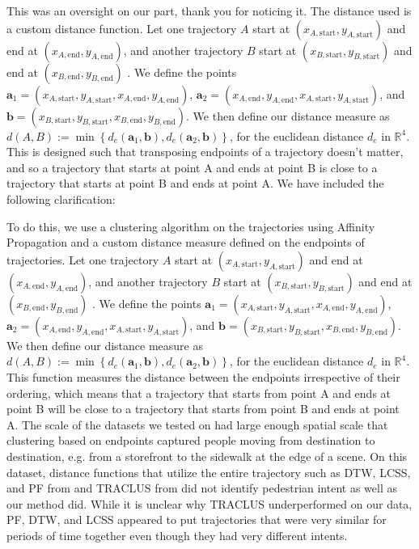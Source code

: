 \documentclass[usenames,dvipsnames]{article}
\providecommand{\response}[1]{
\noindent
\noindent\colorbox{gray!20}{
\parbox{\textwidth}{
\setlength{\parskip}{.1in}
\setlength{\parindent}{.1in}
#1}
}
}
\begin{document}
\begin{enumerate}
\begin{item}
This was an oversight on our part, thank you for noticing it. 
The distance used is a custom distance function. 
Let one trajectory $A$ start at $(x_{A,\mathrm{start}}, y_{A,\mathrm{start}})$ and end at  $(x_{A,\mathrm{end}}, y_{A,\mathrm{end}})$, and another trajectory $B$ start at $(x_{B,\mathrm{start}}, y_{B,\mathrm{start}})$ and end at $(x_{B,\mathrm{end}}, y_{B,\mathrm{end}})$ . 
We define the points $\mathbf{a}_1 = (x_{A, \mathrm{start}}, y_{A, \mathrm{start}}, x_{A, \mathrm{end}}, y_{A, \mathrm{end}})$, $\mathbf{a}_2 = (x_{A, \mathrm{end}}, y_{A, \mathrm{end}}, x_{A, \mathrm{start}}, y_{A, \mathrm{start}})$, and $\mathbf{b} = (x_{B, \mathrm{start}}, y_{B, \mathrm{start}}, x_{B, \mathrm{end}}, y_{B, \mathrm{end}})$. 
We then define our distance measure as $d(A, B) :=  \min \left\{ d_e(\mathbf{a}_1, \mathbf{b}), d_e(\mathbf{a}_2, \mathbf{b}) \right\}$, for the euclidean distance $d_e$ in $\mathbb{R}^4$.  This is designed such that transposing endpoints of a trajectory doesn't matter, and so a trajectory that starts at point A and ends at point B is close to a trajectory that starts at point B and ends at point A.  
We have included the following clarification:

\reversemarginpar{}
\response{To do this, we use a clustering algorithm on the trajectories using Affinity Propagation \cite{FreyDueck2007} and a custom distance measure defined on the endpoints of trajectories. 
	Let one trajectory $A$ start at $(x_{A,\mathrm{start}}, y_{A,\mathrm{start}})$ and end at  $(x_{A,\mathrm{end}}, y_{A,\mathrm{end}})$, and another trajectory $B$ start at $(x_{B,\mathrm{start}}, y_{B,\mathrm{start}})$ and end at $(x_{B,\mathrm{end}}, y_{B,\mathrm{end}})$ . 
	We define the points $\mathbf{a}_1 = (x_{A, \mathrm{start}}, y_{A, \mathrm{start}}, x_{A, \mathrm{end}}, y_{A, \mathrm{end}})$, $\mathbf{a}_2 = (x_{A, \mathrm{end}}, y_{A, \mathrm{end}}, x_{A, \mathrm{start}}, y_{A, \mathrm{start}})$, and $\mathbf{b} = (x_{B, \mathrm{start}}, y_{B, \mathrm{start}}, x_{B, \mathrm{end}}, y_{B, \mathrm{end}})$. 
	We then define our distance measure as $d(A, B) :=  \min \left\{ d_e(\mathbf{a}_1, \mathbf{b}), d_e(\mathbf{a}_2, \mathbf{b}) \right\}$, for the euclidean distance $d_e$ in $\mathbb{R}^4$. 
	This function measures the distance between the endpoints irrespective of their ordering, which means that a trajectory that starts from point A and ends at point B will be close to a trajectory that starts from point B and ends at point A.
	The scale of the datasets we tested on had large enough spatial scale that clustering based on endpoints captured people moving from destination to destination, e.g. from a storefront to the sidewalk at the edge of a scene. On this dataset, distance functions that utilize the entire trajectory such as DTW, LCSS, and PF from \cite{Morris2009} and TRACLUS from \cite{Lee2007} did not identify pedestrian intent as well as our method did. While it is unclear why TRACLUS underperformed on our data, PF, DTW, and LCSS appeared to put trajectories that were very similar for periods of time together even though they had very different intents.}
	

\end{item}
\end{enumerate}
\end{document}
